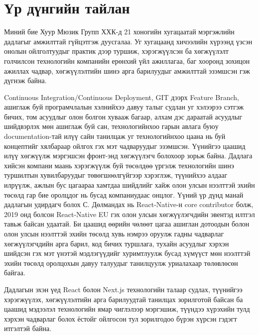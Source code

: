 
\section{Үр дүнгийн тайлан}
Миний бие Хуур Мюзик Групп ХХК-д 21 хоногийн хугацаатай мэргэжлийн дадлагыг амжилттай гүйцэтгэж дуусгалаа. Уг хугацаанд хичээлийн хүрээнд үзсэн онолын ойлголтуудыг практик дээр туршиж, хэрэгжүүлсэн ба хөгжүүлэлт голчилсон технологийн компанийн ерөнхий үйл ажиллагаа, баг хооронд зохицон ажиллах чадвар, хөгжүүлэлтийн шинэ арга барилуудыг амжилттай эзэмшсэн гэж дүгнэж байна.

\quad Continuous Integration/Continuous Deployment, GIT дээрх Feature Branch, ашиглаж буй програмчлалын хэлнийхээ давуу талыг судлан уг хэлээрээ сэтгэж бичих, том асуудлыг олон болгон хувааж багаар, алхам дэс дараатай асуудлыг шийдвэрлэх мөн ашиглаж буй сан, технологийнхоо гарын авлага буюу documentation-тай илүү сайн танилцаж уг технологийнхоо цаана нь буй концептийг хялбараар ойлгох гэх мэт чадваруудыг эзэмшсэн. Үүнийгээ цаашид илүү хөгжүүлж мэргэшсэн фронт-энд хөгжүүлэгч болохоор зорьж байна. Дадлага хийсэн компани маань хэрэгжүүлж буй төсөлдөө үргэлж технологийн шинэ туршилтын хувилбаруудыг төвөгшөөлгүйгээр хэрэглэж, түүнийхээ алдааг илрүүлж, ажлын бус цагаараа хамтдаа шийдлийг хайж олон улсын нээлттэй эхийн төсөлд гар бие оролцдог нь бусад компаниудаас онцлог. Үүний үр дүнд манай дадлагын удирдагч болох С. Дөлмандах нь React-Native-н core contributor болж, 2019 онд болсон React-Native EU гэх олон улсын хөгжүүлэгчдийн эвентэд илтгэл тавьж байсан удаатай. Би цаашид өөрийн чөлөөт цагаа ашиглан дотоодын болон олон улсын нээлттэй эхийн төсөлд хувь нэмрээ оруулж гадны чадварлаг хөгжүүлэгчдийн арга барил, код бичих туршлага, тухайн асуудлыг хэрхэн шийдсэн гэх мэт үнэтэй мэдлэгүүдийг хуримтлуулж бусад хүмүүст мөн нээлттэй эхийн төсөлд оролцохын давуу талуудыг танилцуулж уриалахаар төлөвлөсөн байгаа.

\quad Дадлагын эхэн үед React болон Next.js технологийн талаар судлах, түүнийгээ хэрэгжүүлэх, хөгжүүлэлтийн арга барилуудтай танилцах зорилготой байсан ба цаашид мэдээлэл технологийн ямар чиглэлээр мэргэшиж, түүндээ хүрэхийн тулд хэрхэн чадварлаг болох ёстойг ойлгосон тул зорилгодоо бүрэн хүрсэн гэдэгт итгэлтэй байна. 